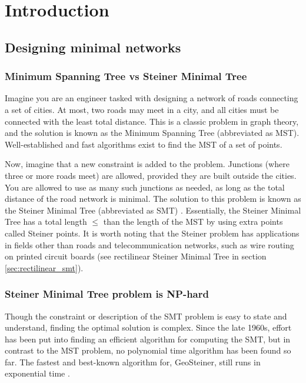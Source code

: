 \documentclass{l4proj}
\begin{document}
\def\consentname {Pieter van Tuijl}
\def\consentdate {27 March 2025}
\educationalconsent


\tableofcontents

\chapter{Introduction}


\section{Designing minimal networks}
\subsection{Minimum Spanning Tree vs Steiner Minimal Tree}
Imagine you are an engineer tasked with designing a network of roads connecting a set of cities. At most, two roads may meet in a city, and all cities must be connected with the least total distance. This is a classic problem in graph theory, and the solution is known as the Minimum Spanning Tree (abbreviated as MST). Well-established and fast algorithms exist to find the MST of a set of points.

Now, imagine that a new constraint is added to the problem. Junctions (where three or more roads meet) are allowed, provided they are built outside the cities. You are allowed to use as many such junctions as needed, as long as the total distance of the road network is minimal. The solution to this problem is known as the Steiner Minimal Tree (abbreviated as SMT) \citep{MelzakAlgo}.
Essentially, the Steiner Minimal Tree has a total length  $\leq$ than the length of the MST by using extra points called Steiner points.
It is worth noting that the Steiner problem has applications in fields other than roads and telecommunication networks, such as wire routing on printed circuit boards (see rectilinear Steiner Minimal Tree in section \ref{sec:rectilinear_smt}).

\subsection{Steiner Minimal Tree problem is NP-hard}
Though the constraint or description of the SMT problem is easy to state and understand, finding the optimal solution is complex.
Since the late 1960s, effort has been put into finding an efficient algorithm for computing the SMT, but in contrast to the MST problem, no polynomial time algorithm has been found so far. The fastest and best-known algorithm for, GeoSteiner, still runs in exponential time \citep{geosteiner96}.
\end{document}
